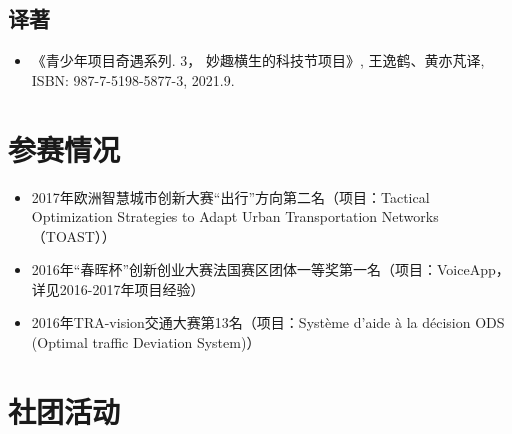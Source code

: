 \documentclass[letterpaper]{twentysecondcv} %
\begin{document}
\vspace{-0.1cm}
\subsection{译著}
\begin{itemize}
    \item 《青少年项目奇遇系列. 3， 妙趣横生的科技节项目》, 王逸鹤、黄亦芃译, ISBN: 987-7-5198-5877-3, 2021.9.
\end{itemize}

\vspace{-0.1cm}
\section{参赛情况}
\vspace{-0.1cm}
\begin{itemize}
    \item 2017年欧洲智慧城市创新大赛``出行''方向第二名（项目：Tactical Optimization Strategies to Adapt Urban Transportation Networks（TOAST））
    \item 2016年``春晖杯''创新创业大赛法国赛区团体一等奖第一名（项目：VoiceApp，详见2016-2017年项目经验）
    \item 2016年TRA-vision交通大赛第13名（项目：Système d'aide à la décision ODS (Optimal traffic Deviation System)）
\end{itemize}

\vspace{-0.1cm}
\section{社团活动}
\end{document}
